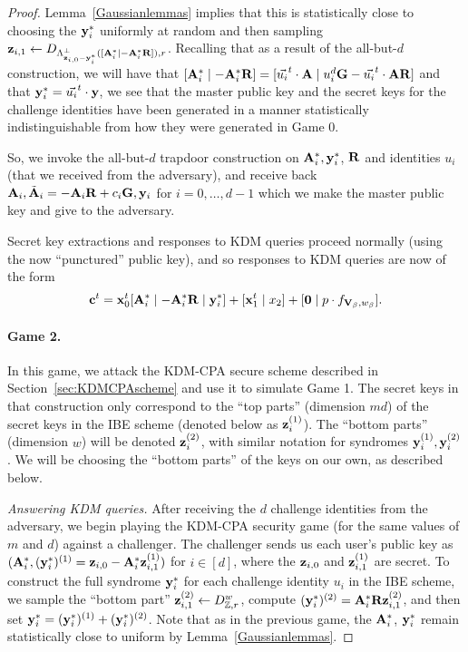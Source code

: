 \begin{proof}
  Lemma~\ref{Gaussianlemmas} implies that this is statistically close
  to choosing the $\mathbf{y}_i^*$ uniformly at random and then sampling
  $\mathbf{z}_{i,1} \gets D_{\Lambda^{\perp}_{\mathbf{z}_{i,0}-\mathbf{y}_i^*}([\mathbf{A}_i^*
    \mid -\mathbf{A}_i^*\mathbf{R}]), r}$.  Recalling that as a result of the
  all-but-$d$ construction, we will have that $[\mathbf{A}_i^* \mid
  -\mathbf{A}_i^*\mathbf{R}] = [\vec{u_i}^t \cdot \mathbf{A} \mid u_i^d\mathbf{G}
  -\vec{u_i}^t \cdot \mathbf{A}\mathbf{R}]$ and that $\mathbf{y}_i^* = \vec{u_i}^t
  \cdot \mathbf{y}$, we see that the master public key and the secret keys
  for the challenge identities have been generated in a manner
  statistically indistinguishable from how they were generated in Game
  0.
    
  So, we invoke the all-but-$d$ trapdoor construction on $\mathbf{A}_i^*,
  \mathbf{y}_i^*$, $\mathbf{R}$ and identities $u_i$ (that we received from the
  adversary), and receive back $\mathbf{A}_i, \tilde{\mathbf{A}}_i =
  -\mathbf{A}_i\mathbf{R}+c_i\mathbf{G}, \mathbf{y}_i$ for $i =0, \ldots, d-1$ which we
  make the master public key and give to the adversary.

  Secret key extractions and responses to KDM queries proceed normally
  (using the now ``punctured'' public key), and so responses to KDM
  queries are now of the form
  \begin{equation}\mathbf{c}^t = \mathbf{x}_0^t[\mathbf{A}_i^{*} \mid
    -\mathbf{A}_i^{*}\mathbf{R} \mid \mathbf{y}_{i}^{*}]+[\mathbf{x}_1^t \mid x_2] +
    [\mathbf{0} \mid p \cdot
    f_{\mathbf{V}_{\beta}, w_{\beta}}].
  \end{equation}
    
  \paragraph{Game 2.} In this game, we attack the KDM-CPA secure
  scheme described in Section~\ref{sec:KDMCPAscheme} and use it to
  simulate Game 1. The secret keys in that construction only
  correspond to the ``top parts'' (dimension $md$) of the secret keys
  in the IBE scheme (denoted below as $\mathbf{z}_{i}^{(1)}$). The ``bottom
  parts'' (dimension $w$) will be denoted $\mathbf{z}_{i}^{(2)}$, with
  similar notation for syndromes $\mathbf{y}_i^{(1)}, \mathbf{y}_i^{(2)}$.  We
  will be choosing the ``bottom parts'' of the keys on our own, as
  described below.
   
  \emph{Answering KDM queries.}  After receiving the $d$ challenge
  identities from the adversary, we begin playing the KDM-CPA security
  game (for the same values of $m$ and $d$) against a challenger.  The
  challenger sends us each user's public key as $(\mathbf{A}_i^*,
  (\mathbf{y}_i^{*})^{(1)}=\mathbf{z}_{i,0}-\mathbf{A}_i^*\mathbf{z}_{i,1}^{(1)})$ for $i
  \in [d]$, where the $\mathbf{z}_{i, 0}$ and $\mathbf{z}_{i,1}^{(1)}$ are
  secret.  To construct the full syndrome $\mathbf{y}_i^*$ for each
  challenge identity $u_i$ in the IBE scheme, we sample the ``bottom
  part'' $\mathbf{z}_{i,1}^{(2)} \gets D_{\mathbb{Z}, r}^{w}$, compute
  $(\mathbf{y}_i^{*})^{(2)} = \mathbf{A}_i^{*}\mathbf{R}\mathbf{z}_{i,1}^{(2)}$, and then
  set $\mathbf{y}_i^* = (\mathbf{y}_i^{*})^{(1)}+(\mathbf{y}_i^{*})^{(2)}$. Note that
  as in the previous game, the $\mathbf{A}_i^*$, $\mathbf{y}_i^*$ remain
  statistically close to uniform by Lemma~\ref{Gaussianlemmas}.


\end{proof}
